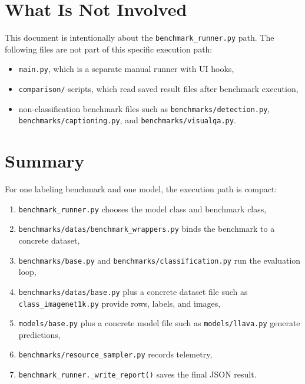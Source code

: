 \documentclass[11pt]{article}
\begin{document}
\section{What Is Not Involved}
This document is intentionally about the \texttt{benchmark\_runner.py} path. The following files are not part of this specific execution path:
\begin{itemize}[leftmargin=*]
    \item \texttt{main.py}, which is a separate manual runner with UI hooks,
    \item \texttt{comparison/} scripts, which read saved result files after benchmark execution,
    \item non-classification benchmark files such as \texttt{benchmarks/detection.py}, \texttt{benchmarks/captioning.py}, and \texttt{benchmarks/visualqa.py}.
\end{itemize}

\section{Summary}
For one labeling benchmark and one model, the execution path is compact:
\begin{enumerate}[label=\arabic*.]
    \item \texttt{benchmark\_runner.py} chooses the model class and benchmark class,
    \item \texttt{benchmarks/datas/benchmark\_wrappers.py} binds the benchmark to a concrete dataset,
    \item \texttt{benchmarks/base.py} and \texttt{benchmarks/classification.py} run the evaluation loop,
    \item \texttt{benchmarks/datas/base.py} plus a concrete dataset file such as \texttt{class\_imagenet1k.py} provide rows, labels, and images,
    \item \texttt{models/base.py} plus a concrete model file such as \texttt{models/llava.py} generate predictions,
    \item \texttt{benchmarks/resource\_sampler.py} records telemetry,
    \item \texttt{benchmark\_runner.\_write\_report()} saves the final JSON result.
\end{enumerate}
\end{document}
